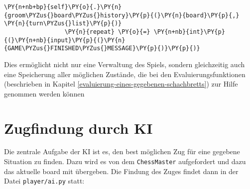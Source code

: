 \begin{Verbatim}[commandchars=\\\{\}]
                 \PY{n+nb+bp}{self}\PY{o}{.}\PY{n}{groom\PYZus{}board\PYZus{}history}\PY{p}{(}\PY{n}{board}\PY{p}{,} \PY{n}{turn\PYZus{}list}\PY{p}{)}
                 \PY{n}{repeat} \PY{o}{=} \PY{n+nb}{int}\PY{p}{(}\PY{n+nb}{input}\PY{p}{(}\PY{n}{GAME\PYZus{}FINISHED\PYZus{}MESSAGE}\PY{p}{)}\PY{p}{)}
\end{Verbatim}

    Dies ermöglicht nicht nur eine Verwaltung des Spiels, sondern
gleichzeitig auch eine Speicherung aller möglichen Zustände, die bei den
Evaluierungsfunktionen (beschrieben in Kapitel \ref{evaluierung-eines-gegebenen-schachbretts}) zur Hilfe genommen werden
können

    \section{Zugfindung durch KI}\label{zugfindung-durch-ki}

Die zentrale Aufgabe der KI ist es, den best möglichen Zug für eine
gegebene Situation zu finden. Dazu wird es
von dem \texttt{ChessMaster} aufgefordert und dazu das aktuelle
board mit übergeben. Die Findung des Zuges findet dann in der Datei
\texttt{player/ai.py} statt:

